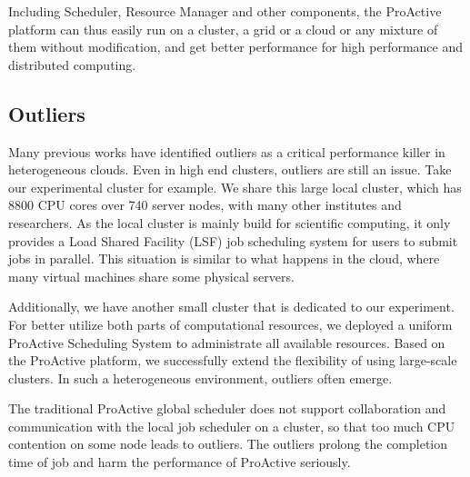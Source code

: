 Including Scheduler, Resource Manager and other components, the ProActive platform can thus easily run on a cluster, a grid or a cloud or any mixture of them without modification, and get better performance for high performance and distributed computing.

\subsection{Outliers}

Many previous works have identified outliers as a critical performance killer in heterogeneous clouds. Even in high end clusters, outliers are still an issue. Take our experimental cluster for example. We share this large local cluster, which has 8800 CPU cores over 740 server nodes, with many other institutes and researchers. As the local cluster is mainly build for scientific computing, it only provides a Load Shared Facility (LSF) job scheduling system for users to submit jobs in parallel. This situation is similar to what happens in the cloud, where many virtual machines share some physical servers.

Additionally, we have another small cluster that is dedicated to our experiment. For better utilize both parts of computational resources, we deployed a uniform ProActive Scheduling System to administrate all available resources. Based on the ProActive platform, we successfully extend the flexibility of using large-scale clusters. In such a heterogeneous environment, outliers often emerge.

The traditional ProActive global scheduler does not support collaboration and communication with the local job scheduler on a cluster, so that too much CPU contention on some node leads to outliers. The outliers prolong the completion time of job and harm the performance of ProActive seriously.
